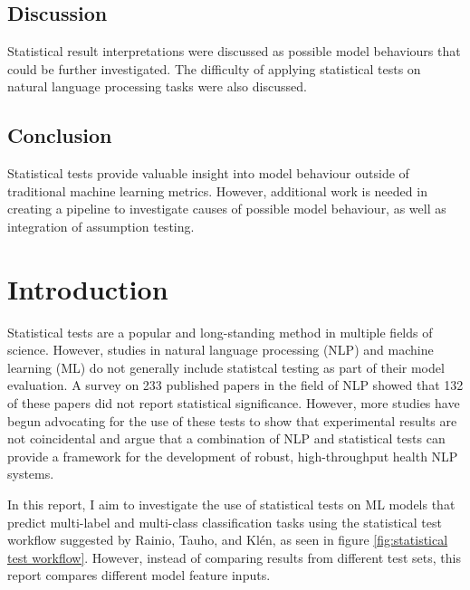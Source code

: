 \documentclass[10.7pt, onecolumn]{article}
\begin{document}
\subsection{Discussion}

Statistical result interpretations were discussed as possible model behaviours that could be further investigated. The difficulty of applying statistical tests on natural language processing tasks were also discussed.

\subsection{Conclusion}

Statistical tests provide valuable insight into model behaviour outside of traditional machine learning metrics. However, additional work is needed in creating a pipeline to investigate causes of possible model behaviour, as well as integration of assumption testing.

\section{Introduction}\label{introduction}
Statistical tests are a popular and long-standing method in multiple fields of science. However, studies in natural language processing (NLP) and machine learning (ML) do not generally include statistcal testing as part of their model evaluation. A survey on 233 published papers in the field of NLP showed that 132 of these papers did not report statistical significance\cite{statsPaper}. However, more studies have begun advocating for the use of these tests to show that experimental results are not coincidental\cite{statsPaper} and argue that a combination of NLP and statistical tests can provide a framework for the development of robust, high-throughput health NLP systems\cite{10.1197/jamia.M3028}. 

In this report, I aim to investigate the use of statistical tests on ML models that predict multi-label and multi-class  classification tasks using the statistical test workflow suggested by Rainio, Tauho, and Klén\cite{statsBased}, as seen in figure \ref{fig:statistical test workflow}. However, instead of comparing results from different test sets, this report compares different model feature inputs.
\end{document}
